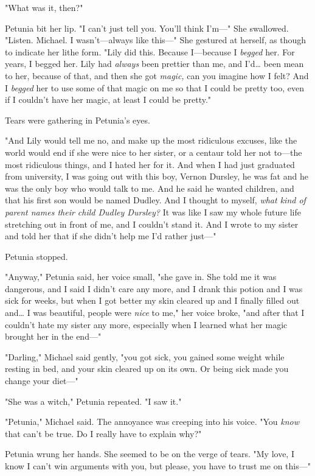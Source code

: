 "What was it, then?"

Petunia bit her lip. "I can't just tell you. You'll think I'm---" She
swallowed. "Listen. Michael. I wasn't---always like this---" She gestured at
herself, as though to indicate her lithe form. "Lily did this. Because
I---because I \emph{begged} her. For years, I begged her. Lily had
\emph{always} been prettier than me, and I'd{\ldots} been mean to her, because
of that, and then she got \emph{magic,} can you imagine how I felt? And I
\emph{begged} her to use some of that magic on me so that I could be pretty
too, even if I couldn't have her magic, at least I could be pretty."

Tears were gathering in Petunia's eyes.

"And Lily would tell me no, and make up the most ridiculous excuses, like the
world would end if she were nice to her sister, or a centaur told her not
to---the most ridiculous things, and I hated her for it. And when I had just
graduated from university, I was going out with this boy, Vernon Dursley, he
was fat and he was the only boy who would talk to me. And he said he wanted
children, and that his first son would be named Dudley. And I thought to
myself, \emph{what kind of parent names their child Dudley Dursley?} It was
like I saw my whole future life stretching out in front of me, and I couldn't
stand it. And I wrote to my sister and told her that if she didn't help me I'd
rather just---"

Petunia stopped.

"Anyway," Petunia said, her voice small, "she gave in. She told me it was
dangerous, and I said I didn't care any more, and I drank this potion and I was
sick for weeks, but when I got better my skin cleared up and I finally filled
out and{\ldots} I was beautiful, people were \emph{nice} to me," her voice
broke, "and after that I couldn't hate my sister any more, especially when I
learned what her magic brought her in the end---"

"Darling," Michael said gently, "you got sick, you gained some weight while
resting in bed, and your skin cleared up on its own. Or being sick made you
change your diet---"

"She was a witch," Petunia repeated. "I saw it."

"Petunia," Michael said. The annoyance was creeping into his voice. "You
\emph{know} that can't be true. Do I really have to explain why?"

Petunia wrung her hands. She seemed to be on the verge of tears. "My love, I
know I can't win arguments with you, but please, you have to trust me on
this---"

